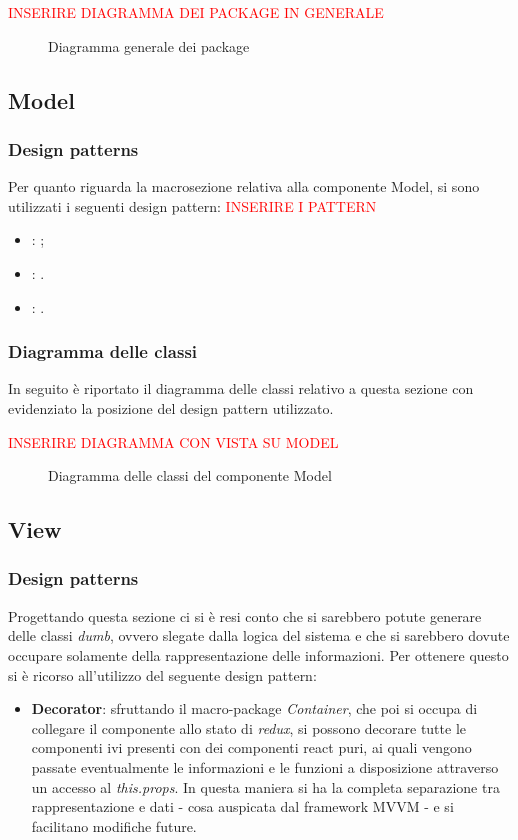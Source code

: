 {\textcolor{red}{INSERIRE DIAGRAMMA DEI PACKAGE IN GENERALE}}
\begin{figure}[h]
	\centering
	\caption{Diagramma generale dei package}
	\label{}
\end{figure}

	\subsection{Model}
		\subsubsection{Design patterns}
		Per quanto riguarda la macrosezione relativa alla componente Model, si sono utilizzati i seguenti design pattern: {\textcolor{red}{INSERIRE I PATTERN}}
			\begin{itemize}
				\item \textbf{}: ;
				\item \textbf{}: .
				\item \textbf{}: .
			\end{itemize}
		
		\subsubsection{Diagramma delle classi}
		In seguito è riportato il diagramma delle classi relativo a questa sezione con evidenziato la posizione del design pattern utilizzato.
	
	{\textcolor{red}{INSERIRE DIAGRAMMA CON VISTA SU MODEL}}
	\begin{figure}[h]
		\centering
		\caption{Diagramma delle classi del componente Model}
		\label{}
	\end{figure}
	
	\subsection{View}
		\subsubsection{Design patterns}
		Progettando questa sezione ci si è resi conto che si sarebbero potute generare delle classi \emph{dumb}, ovvero slegate dalla logica del sistema e che si sarebbero dovute occupare solamente della rappresentazione delle informazioni. Per ottenere questo si è ricorso all'utilizzo del seguente design pattern:
			\begin{itemize}
				\item \textbf{Decorator}: sfruttando il macro-package \emph{Container}, che poi si occupa di collegare il componente allo stato di \emph{redux}, si possono decorare tutte le componenti ivi presenti con dei componenti react puri, ai quali vengono passate eventualmente le informazioni e le funzioni a disposizione attraverso un accesso al \emph{this.props}. In questa maniera si ha la completa separazione tra rappresentazione e dati - cosa auspicata dal framework MVVM - e si facilitano modifiche future.
			\end{itemize}
		
